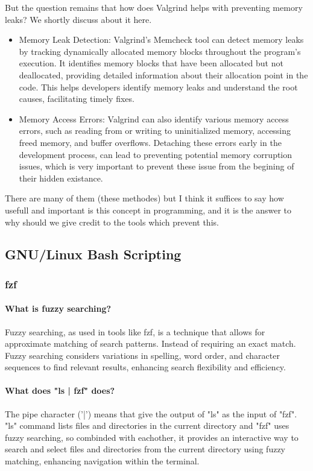 \documentclass{article}
\begin{document}
	But the question remains that how does Valgrind helps with preventing memory leaks? We shortly discuss about it here.

	\begin{itemize}

		\item Memory Leak Detection:
		Valgrind's Memcheck tool can detect memory leaks by tracking dynamically allocated memory blocks throughout the program's execution.
		It identifies memory blocks that have been allocated but not deallocated, providing detailed information about their allocation point in the code.
		This helps developers identify memory leaks and understand the root causes, facilitating timely fixes.

		\item Memory Access Errors:
		Valgrind can also identify various memory access errors, such as reading from or writing to uninitialized memory, accessing freed memory, and buffer overflows. Detaching these errors early in the development process, can lead to preventing potential memory corruption issues, which is very important to prevent these issue from the begining of their hidden existance.

	\end{itemize}

	There are many of them (these methodes) but I think it suffices to say how usefull and important is this concept in programming, and it is the answer to why should we give credit to the tools which prevent this.


	\subsection{GNU/Linux Bash Scripting}
	\subsubsection{fzf}
	\paragraph{What is fuzzy searching?}
	Fuzzy searching, as used in tools like fzf, is a technique that allows for approximate matching of search patterns. Instead of requiring an exact match.
	Fuzzy searching considers variations in spelling, word order, and character sequences to find relevant results, enhancing search flexibility and efficiency.

	\paragraph{What does "ls | fzf" does?}
	The pipe character ('|') means that give the output of "ls" as the input of "fzf".
	"ls" command lists files and directories in the current directory
	and "fzf" uses fuzzy searching, so combinded with eachother,
	it provides an interactive way to search and select files and directories from the current directory using fuzzy matching, enhancing navigation within the terminal.
\end{document}
